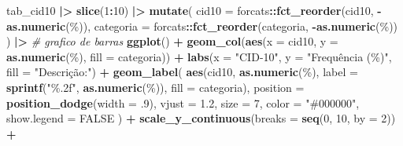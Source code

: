 \documentclass[
]{article}
\newenvironment{Shaded}{\begin{snugshade}}{\end{snugshade}}
\newcommand{\AttributeTok}[1]{\textcolor[rgb]{0.13,0.29,0.53}{#1}}
\newcommand{\CommentTok}[1]{\textcolor[rgb]{0.56,0.35,0.01}{\textit{#1}}}
\newcommand{\ConstantTok}[1]{\textcolor[rgb]{0.56,0.35,0.01}{#1}}
\newcommand{\DecValTok}[1]{\textcolor[rgb]{0.00,0.00,0.81}{#1}}
\newcommand{\FloatTok}[1]{\textcolor[rgb]{0.00,0.00,0.81}{#1}}
\newcommand{\FunctionTok}[1]{\textcolor[rgb]{0.13,0.29,0.53}{\textbf{#1}}}
\newcommand{\NormalTok}[1]{#1}
\newcommand{\SpecialCharTok}[1]{\textcolor[rgb]{0.81,0.36,0.00}{\textbf{#1}}}
\newcommand{\StringTok}[1]{\textcolor[rgb]{0.31,0.60,0.02}{#1}}
\begin{document}
\begin{Shaded}
\begin{Highlighting}[]
\NormalTok{tab\_cid10 }\SpecialCharTok{|\textgreater{}} 
  \FunctionTok{slice}\NormalTok{(}\DecValTok{1}\SpecialCharTok{:}\DecValTok{10}\NormalTok{) }\SpecialCharTok{|\textgreater{}} 
  \FunctionTok{mutate}\NormalTok{(}
    \AttributeTok{cid10 =}\NormalTok{ forcats}\SpecialCharTok{::}\FunctionTok{fct\_reorder}\NormalTok{(cid10, }\SpecialCharTok{{-}}\FunctionTok{as.numeric}\NormalTok{(}\StringTok{\textasciigrave{}}\AttributeTok{\%}\StringTok{\textasciigrave{}}\NormalTok{)),}
    \AttributeTok{categoria =}\NormalTok{ forcats}\SpecialCharTok{::}\FunctionTok{fct\_reorder}\NormalTok{(categoria, }\SpecialCharTok{{-}}\FunctionTok{as.numeric}\NormalTok{(}\StringTok{\textasciigrave{}}\AttributeTok{\%}\StringTok{\textasciigrave{}}\NormalTok{))}
\NormalTok{  ) }\SpecialCharTok{|\textgreater{}}
  \CommentTok{\# grafico de barras}
  \FunctionTok{ggplot}\NormalTok{() }\SpecialCharTok{+}
    \FunctionTok{geom\_col}\NormalTok{(}\FunctionTok{aes}\NormalTok{(}\AttributeTok{x =}\NormalTok{ cid10, }\AttributeTok{y =} \FunctionTok{as.numeric}\NormalTok{(}\StringTok{\textasciigrave{}}\AttributeTok{\%}\StringTok{\textasciigrave{}}\NormalTok{), }\AttributeTok{fill =}\NormalTok{ categoria)) }\SpecialCharTok{+} 
    \FunctionTok{labs}\NormalTok{(}\AttributeTok{x =} \StringTok{"CID{-}10"}\NormalTok{, }\AttributeTok{y =} \StringTok{"Frequência (\%)"}\NormalTok{, }\AttributeTok{fill =} \StringTok{"Descrição:"}\NormalTok{) }\SpecialCharTok{+} 
    \FunctionTok{geom\_label}\NormalTok{(}
      \FunctionTok{aes}\NormalTok{(cid10, }\FunctionTok{as.numeric}\NormalTok{(}\StringTok{\textasciigrave{}}\AttributeTok{\%}\StringTok{\textasciigrave{}}\NormalTok{), }\AttributeTok{label =} \FunctionTok{sprintf}\NormalTok{(}\StringTok{"\%.2f"}\NormalTok{, }\FunctionTok{as.numeric}\NormalTok{(}\StringTok{\textasciigrave{}}\AttributeTok{\%}\StringTok{\textasciigrave{}}\NormalTok{)), }\AttributeTok{fill =}\NormalTok{ categoria), }
      \AttributeTok{position =} \FunctionTok{position\_dodge}\NormalTok{(}\AttributeTok{width =}\NormalTok{ .}\DecValTok{9}\NormalTok{), }\AttributeTok{vjust =} \FloatTok{1.2}\NormalTok{, }\AttributeTok{size =} \DecValTok{7}\NormalTok{, }\AttributeTok{color =} \StringTok{"\#000000"}\NormalTok{, }
      \AttributeTok{show.legend =} \ConstantTok{FALSE}
\NormalTok{    ) }\SpecialCharTok{+}
    \FunctionTok{scale\_y\_continuous}\NormalTok{(}\AttributeTok{breaks =} \FunctionTok{seq}\NormalTok{(}\DecValTok{0}\NormalTok{, }\DecValTok{10}\NormalTok{, }\AttributeTok{by =} \DecValTok{2}\NormalTok{)) }\SpecialCharTok{+}

\end{Highlighting}
\end{Shaded}
\end{document}
